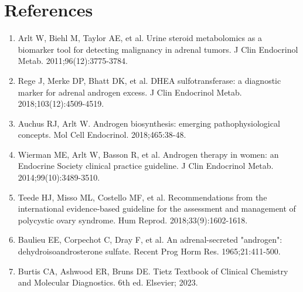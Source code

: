 \section*{References}
\begin{enumerate}
  \item Arlt W, Biehl M, Taylor AE, et al. Urine steroid metabolomics as a biomarker tool for detecting malignancy in adrenal tumors. J Clin Endocrinol Metab. 2011;96(12):3775-3784.
  \item Rege J, Merke DP, Bhatt DK, et al. DHEA sulfotransferase: a diagnostic marker for adrenal androgen excess. J Clin Endocrinol Metab. 2018;103(12):4509-4519.
  \item Auchus RJ, Arlt W. Androgen biosynthesis: emerging pathophysiological concepts. Mol Cell Endocrinol. 2018;465:38-48.
  \item Wierman ME, Arlt W, Basson R, et al. Androgen therapy in women: an Endocrine Society clinical practice guideline. J Clin Endocrinol Metab. 2014;99(10):3489-3510.
  \item Teede HJ, Misso ML, Costello MF, et al. Recommendations from the international evidence-based guideline for the assessment and management of polycystic ovary syndrome. Hum Reprod. 2018;33(9):1602-1618.
  \item Baulieu EE, Corpechot C, Dray F, et al. An adrenal-secreted "androgen": dehydroisoandrosterone sulfate. Recent Prog Horm Res. 1965;21:411-500.
  \item Burtis CA, Ashwood ER, Bruns DE. Tietz Textbook of Clinical Chemistry and Molecular Diagnostics. 6th ed. Elsevier; 2023.
\end{enumerate}

\clearpage

